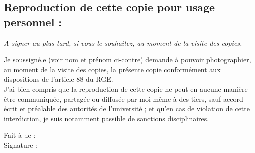 \begin{framed}
\section*{\small Reproduction de cette copie pour usage personnel :}

{\footnotesize
\textit{A signer au plus tard, si vous le souhaitez, au moment de la visite des copies.}

Je soussigné.e (voir nom et prénom ci-contre) demande à pouvoir photographier, au moment de la visite des copies, la présente copie conformément aux dispositions de l’article 88 du RGE. \\
J’ai bien compris que la reproduction de cette copie ne peut en aucune manière être communiquée, partagée ou diffusée par moi-même à des tiers, sauf accord écrit et préalable des autorités de l’université ; et qu’en cas de violation de cette interdiction, je suis notamment passible de sanctions disciplinaires.

Fait à :\hspace*{3cm}le :\\ Signature :\\}
\end{framed}